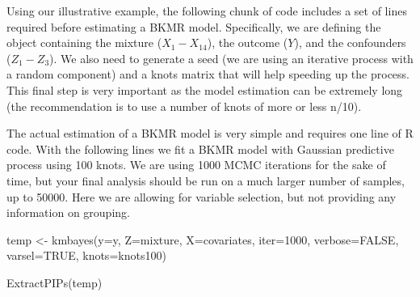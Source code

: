 \documentclass[
]{book}
\newenvironment{Shaded}{\begin{snugshade}}{\end{snugshade}}
\newcommand{\AttributeTok}[1]{\textcolor[rgb]{0.77,0.63,0.00}{#1}}
\newcommand{\ConstantTok}[1]{\textcolor[rgb]{0.00,0.00,0.00}{#1}}
\newcommand{\DecValTok}[1]{\textcolor[rgb]{0.00,0.00,0.81}{#1}}
\newcommand{\FunctionTok}[1]{\textcolor[rgb]{0.00,0.00,0.00}{#1}}
\newcommand{\NormalTok}[1]{#1}
\newcommand{\OtherTok}[1]{\textcolor[rgb]{0.56,0.35,0.01}{#1}}
\newcommand{\SpecialCharTok}[1]{\textcolor[rgb]{0.00,0.00,0.00}{#1}}
\begin{document}
Using our illustrative example, the following chunk of code includes a set of lines required before estimating a BKMR model. Specifically, we are defining the object containing the mixture (\(X_{1}-X_{14}\)), the outcome (\(Y\)), and the confounders (\(Z_1-Z_3\)). We also need to generate a seed (we are using an iterative process with a random component) and a knots matrix that will help speeding up the process. This final step is very important as the model estimation can be extremely long (the recommendation is to use a number of knots of more or less n/10).

\begin{Shaded}
\end{Shaded}

The actual estimation of a BKMR model is very simple and requires one line of R code. With the following lines we fit a BKMR model with Gaussian predictive process using 100 knots. We are using 1000 MCMC iterations for the sake of time, but your final analysis should be run on a much larger number of samples, up to 50000. Here we are allowing for variable selection, but not providing any information on grouping.

\begin{Shaded}
\begin{Highlighting}[]
\NormalTok{temp }\OtherTok{\textless{}{-}}  \FunctionTok{kmbayes}\NormalTok{(}\AttributeTok{y=}\NormalTok{y, }\AttributeTok{Z=}\NormalTok{mixture, }\AttributeTok{X=}\NormalTok{covariates, }\AttributeTok{iter=}\DecValTok{1000}\NormalTok{, }\AttributeTok{verbose=}\ConstantTok{FALSE}\NormalTok{, }\AttributeTok{varsel=}\ConstantTok{TRUE}\NormalTok{, }
                 \AttributeTok{knots=}\NormalTok{knots100)}

\FunctionTok{ExtractPIPs}\NormalTok{(temp)}
\end{Highlighting}
\end{Shaded}
\end{document}
